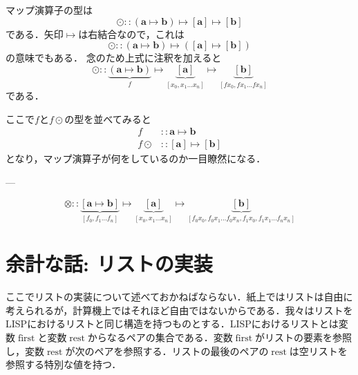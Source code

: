 \documentclass[a5paper,draft]{jsbook}
\newcommand{\programminglanguage}[1]{\textsf{#1}}
\newcommand{\lisp}{\programminglanguage{LISP}}
\newcommand{\mathTypeParameter}[1]{\mathbf{#1}}
\newcommand{\mathListWith}[1]{\left[#1\right]}
\newcommand{\mathListType}[1]{\left[#1\right]}
\newcommand{\mathApplicativeMap}{\mathbin{\otimes}}
\newcommand{\mathIn}{\mathrel{::}}
\newcommand{\mathMap}{\mathbin{\odot}}
\newcommand{\mathMapsTo}{\mapsto}
\newcommand{\mathVarKeyword}[1]{\operatorname{\mathrm{#1}}}
\newcommand{\mathFirst}{\mathVarKeyword{first}}
\newcommand{\mathRest}{\mathVarKeyword{rest}}
\newcommand{\mathMorph}[2]{#1\mathMapsTo#2}
\newcommand{\mathMorphII}[3]{#1\mathMapsTo#2\mathMapsTo#3}
\begin{document}
マップ演算子の型は
\begin{equation}
\mathMap\mathIn{}\mathMorphII{(\mathMorph{\mathTypeParameter{a}}{\mathTypeParameter{b}})}{\mathListType{\mathTypeParameter{a}}}{\mathListType{\mathTypeParameter{b}}}
\end{equation}
である．矢印$\mathMapsTo$は右結合なので，これは
\begin{equation}
\mathMap\mathIn\mathMorph{(\mathMorph{\mathTypeParameter{a}}{\mathTypeParameter{b}})}{\left(\mathMorph{\mathListType{\mathTypeParameter{a}}}{\mathListType{\mathTypeParameter{b}}}\right)}
\end{equation}
の意味でもある．
念のため上式に注釈を加えると
\begin{equation}
\mathMap\mathIn
\underbrace{\left(\mathTypeParameter{a}\mathMapsTo\mathTypeParameter{b}\right)}_f
\mathMapsTo
\underbrace{\mathListType{\mathTypeParameter{a}}}_{\mathListWith{x_0,x_1\dots x_n}}
\mathMapsTo
\underbrace{\mathListType{\mathTypeParameter{b}}}_{\mathListWith{fx_0,fx_1\dots fx_n}}
\end{equation}
である．

ここで$f$と$f\mathMap$の型を並べてみると
\begin{align}
f&\mathIn\mathMorph{\mathTypeParameter{a}}{\mathTypeParameter{b}}\\
f\mathMap&\mathIn\mathMorph{\mathListType{\mathTypeParameter{a}}}{\mathListType{\mathTypeParameter{b}}}
\end{align}
となり，マップ演算子が何をしているのか一目瞭然になる．

---


\begin{equation*}
\mathApplicativeMap\mathIn
\underbrace{\mathListWith{\mathTypeParameter{a}\mathMapsTo\mathTypeParameter{b}}}_{\mathListWith{f_0,f_1\dots f_n}}
\mathMapsTo
\underbrace{\mathListType{\mathTypeParameter{a}}}_{\mathListWith{x_0,x_1\dots x_n}}
\mathMapsTo
\underbrace{\mathListType{\mathTypeParameter{b}}}_{\mathListWith{f_0x_0,f_0x_1\dots f_0x_n,f_1x_0,f_1x_1\dots f_nx_n}}
\end{equation*}


\section{余計な話: リストの実装}

ここでリストの実装について述べておかねばならない．紙上ではリストは自由に考えられるが，計算機上ではそれほど自由ではないからである．我々はリストを\lisp におけるリストと同じ構造を持つものとする．\lisp におけるリストとは変数$\mathFirst$と変数$\mathRest$からなるペアの集合である．変数$\mathFirst$がリストの要素を参照し，変数$\mathRest$が次のペアを参照する．リストの最後のペアの$\mathRest$は空リストを参照する特別な値を持つ．
\end{document}
